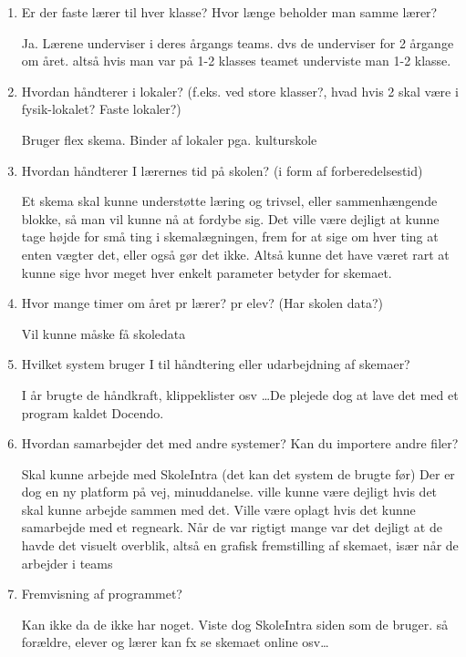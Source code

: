 \begin{enumerate}
	
	\item Er der faste lærer til hver klasse? Hvor længe beholder man samme lærer?

	Ja. Lærene underviser i deres årgangs teams. dvs de underviser for 2 årgange om året. altså hvis man var på 1-2 klasses teamet underviste man 1-2 klasse.
	
	\item Hvordan håndterer i lokaler? (f.eks. ved store klasser?, hvad hvis 2 skal være i fysik-lokalet? Faste lokaler?)
	
	Bruger flex skema. Binder af lokaler pga. kulturskole
	
	\item Hvordan håndterer I lærernes tid på skolen? (i form af forberedelsestid)
	
	Et skema skal kunne understøtte læring og trivsel, eller sammenhængende blokke, så man vil kunne nå at fordybe sig. Det ville være dejligt at kunne tage højde for små ting i skemalægningen, frem for at sige om hver ting at enten vægter det, eller også gør det ikke. Altså kunne det have været rart at kunne sige hvor meget hver enkelt parameter betyder for skemaet. 
	
	\item Hvor mange timer om året pr lærer? pr elev? (Har skolen data?)
	
	Vil kunne måske få skoledata
	
	\item Hvilket system bruger I til håndtering eller udarbejdning af skemaer?

	I år brugte de håndkraft, klippeklister osv \ldots De plejede dog at lave det med et program kaldet Docendo. 
	
	\item Hvordan samarbejder det med andre systemer? Kan du importere andre filer?
	
	Skal kunne arbejde med SkoleIntra (det kan det system de brugte før) Der er dog en ny platform på vej, minuddanelse. ville kunne være dejligt hvis det skal kunne arbejde sammen med det. Ville være oplagt hvis det kunne samarbejde med et regneark. Når de var rigtigt mange var det dejligt at de havde det visuelt overblik, altså en grafisk fremstilling af skemaet, især når de arbejder i teams
	
	\item Fremvisning af programmet?
	
	Kan ikke da de ikke har noget. Viste dog SkoleIntra siden som de bruger. så forældre, elever og lærer kan fx se skemaet online osv\ldots 
	

\end{enumerate}
